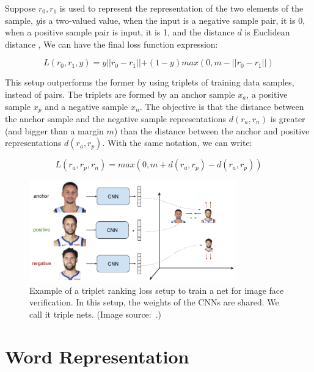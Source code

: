 Suppose $r_0,r_1 $ is used to represent the representation of the two elements of the sample, $y$is a two-valued value, when the input is a negative sample pair, it is 0, when a positive sample pair is input, it is 1, and the distance $d$ is Euclidean distance , We can have the final loss function expression:

\begin{equation}
L(r_0,r_1,y)=y\left || r_0-r_1 \right || + (1-y)max(0,m-\left || r_0-r_1 \right ||)
\end{equation}

This setup outperforms the former by using triplets of training data samples, instead of pairs. The triplets are formed by an anchor sample $x_a$, a positive sample $x_p$ and a negative sample $x_n$. The objective is that the distance between the anchor sample and the negative sample representations $d(r_a,r_n)$ is greater (and bigger than a margin $m$) than the distance between the anchor and positive representations $d(r_a,r_p)$. With the same notation, we can write:

\begin{equation}
L(r_a,r_p,r_n)=max(0,m+d(r_a,r_p)-d(r_a,r_p))
\label{equ:ranking_loss}
\end{equation}

\begin{figure}[!htbp]
	\centering
	\includegraphics[width = 0.8\textwidth]{figures/triplet_loss_faces.png}
	\caption[Example of a triplet ranking loss ]
	{ Example of a triplet ranking loss setup to train a net for image face verification. In this setup, the weights of the CNNs are shared. We call it triple nets. (Image source:~\cite{triplet_loss_em}.)}
	\label{fig:triplet_ranking_loss}
\end{figure}


\section{Word Representation}

